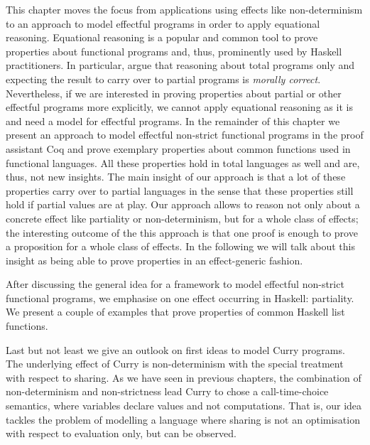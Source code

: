 
This chapter moves the focus from applications using effects like
non-determinism to an approach to model effectful programs in order to
apply equational reasoning.
Equational reasoning is a popular and common tool to prove properties
about functional programs and, thus, prominently used by Haskell
practitioners. 
In particular, \citet{danielsson2006fast} argue that reasoning about
total programs only and expecting the result to carry over to partial
programs is \textit{morally correct}.
Nevertheless, if we are interested in proving properties about partial
or other effectful programs more explicitly, we cannot apply
equational reasoning as it is and need a model for effectful programs.
In the remainder of this chapter we present an approach to model
effectful non-strict functional programs in the proof assistant Coq
and prove exemplary properties about common functions used in
functional languages.
All these properties hold in total languages as well and are, thus,
not new insights.
The main insight of our approach is that a lot of these properties
carry over to partial languages in the sense that these properties
still hold if partial values are at play.
Our approach allows to reason not only about a concrete
effect like partiality or non-determinism, but for a whole class of effects; the
interesting outcome of the this approach is that one proof is
enough to prove a proposition for a whole class of effects.
In the following we will talk about this insight as being able to
prove properties in an effect-generic fashion.

After discussing the general idea for a framework to model effectful
non-strict functional programs, we emphasise on one effect occurring
in Haskell: partiality.
We present a couple of examples that prove properties of common Haskell list
functions.

Last but not least we give an outlook on first ideas to model Curry
programs.
The underlying effect of Curry is non-determinism with the special
treatment with respect to sharing.
As we have seen in previous chapters, the combination of
non-determinism and non-strictness lead Curry to chose a
call-time-choice semantics, where variables declare values and not computations.
That is, our idea tackles the problem of modelling a language where
sharing is not an optimisation with respect to evaluation only, but
can be observed.

